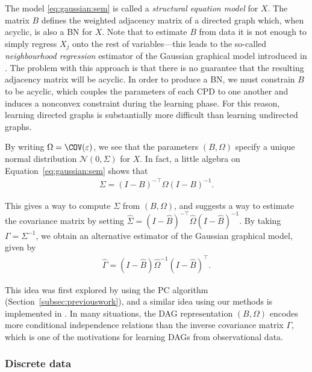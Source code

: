\documentclass[article]{jss}
\newcommand{\rv}{X}
\newcommand{\err}{\varepsilon}
\newcommand{\normalN}{\mathcal{N}}
\newcommand{\trueCov}{\Sigma}
\newcommand{\covest}{\widehat{\trueCov}}
\newcommand{\trueInv}{\Gamma}
\newcommand{\invest}{\widehat{\trueInv}}
\newcommand{\dagmat}{B}
\newcommand{\varmat}{\Omega}
\newcommand{\dagest}{\widehat{\dagmat}}
\newcommand{\varest}{\widehat{\Omega}}
\renewcommand{\|}{\,|\,}
\begin{document}
\noindent
The model \eqref{eq:gaussian:sem} is called a \emph{structural equation model} for $\rv$. The matrix $\dagmat$ defines the weighted adjacency matrix of a directed graph which, when acyclic, is also a BN for $\rv$. Note that to estimate $\dagmat$ from data it is not enough to simply regress $\rv_{j}$ onto the rest of variables---this leads to the so-called \emph{neighbourhood regression} estimator of the Gaussian graphical model introduced in \citet{meinshausen2006}. The problem with this approach is that there is no guarantee that the resulting adjacency matrix will be acyclic. In order to produce a BN, we must constrain $\dagmat$ to be acyclic, which couples the parameters of each CPD to one another and induces a nonconvex constraint during the learning phase. For this reason, learning directed graphs is substantially more difficult than learning undirected graphs.

By writing $\varmat=\COV(\err)$, we see that the parameters $(\dagmat,\varmat)$ specify a unique normal distribution $\normalN(0,\trueCov)$ for $\rv$. In fact, a little algebra on Equation~\ref{eq:gaussian:sem} shows that 
\begin{align}
\label{eq:impliedcov}
\trueCov
= (I-\dagmat)^{-\top}\varmat(I-\dagmat)^{-1}.
\end{align}

\noindent
This gives a way to compute $\trueCov$ from $(\dagmat,\varmat)$, and suggests a way to estimate the covariance matrix by setting $\covest= (I-\dagest)^{-\top}\varest(I-\dagest)^{-1}$. By taking $\trueInv=\trueCov^{-1}$,  we obtain an alternative estimator of the Gaussian graphical model, given by 
\begin{align}
\label{eq:impliedprec}
\invest
= (I-\dagest)\varest^{-1}(I-\dagest)^{\top}.
\end{align}

\noindent
This idea was first explored by \citet{rutimann2009} using the PC algorithm (Section~\ref{subsec:previouswork}), and a similar idea using our methods is implemented in . In many situations, the DAG representation $(\dagmat,\varmat)$ encodes more conditional independence relations than the inverse covariance matrix $\trueInv$, which is one of the motivations for learning DAGs from observational data.

\subsubsection{Discrete data}
\end{document}
